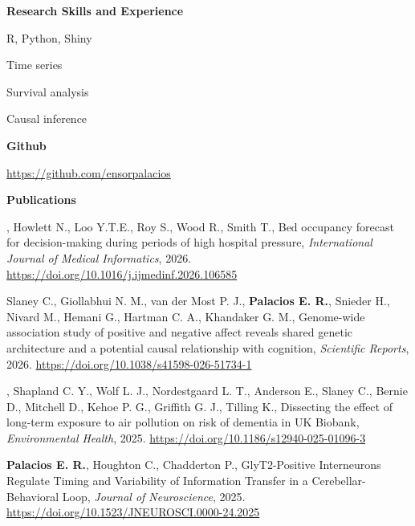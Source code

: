 \documentclass[11pt,usenames, dvipsnames]{article}
\begin{document}
{\large \bfseries \color{color_64493} Research Skills and Experience}
\vspace{10pt}

R, Python, Shiny
\vspace{7pt}

Time series
\vspace{7pt}

Survival analysis
\vspace{7pt}

Causal inference

\vspace{1.2cm}

{\large \bfseries \color{color_64493} Github}
\vspace{10pt}

\url{https://github.com/ensorpalacios}

\vspace{1.2cm}


{\large \bfseries \color{color_64493} Publications}
\vspace{10pt}

, Howlett N., Loo Y.T.E., Roy S., Wood R., Smith T., 
Bed occupancy forecast for decision-making during periods of high hospital pressure, 
\textit{International Journal of Medical Informatics}, 2026.
\url{https://doi.org/10.1016/j.ijmedinf.2026.106585}
\vspace{7pt}

Slaney C., Giollabhui N. M., van der Most P. J., {\bfseries Palacios E. R.}, Snieder H., Nivard M., Hemani G., Hartman C. A., Khandaker G. M., 
Genome-wide association study of positive and negative affect reveals shared genetic architecture and a potential causal relationship with cognition, 
\textit{Scientific Reports}, 2026.
\url{https://doi.org/10.1038/s41598-026-51734-1}
\vspace{7pt}

, Shapland C. Y., Wolf L. J., Nordestgaard L. T., Anderson E., Slaney C., Bernie D., Mitchell D., Kehoe P. G., Griffith G. J., Tilling K.,
Dissecting the effect of long-term exposure to air pollution on risk of dementia in UK Biobank,
\textit{Environmental Health}, 2025.
\url{https://doi.org/10.1186/s12940-025-01096-3}
\vspace{7pt}

{\bfseries Palacios E. R.}, Houghton C., Chadderton P., 
GlyT2-Positive Interneurons Regulate Timing and Variability of Information Transfer in a Cerebellar-Behavioral Loop, 
\textit{Journal of Neuroscience}, 2025. 
\url{https://doi.org/10.1523/JNEUROSCI.0000-24.2025}
\vspace{7pt}
\end{document}
